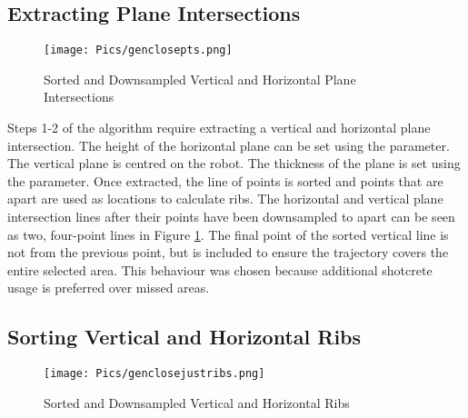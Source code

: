 \subsection{Extracting Plane Intersections}


\begin{figure}[H]
    \centering
    \texttt{[image: Pics/genclosepts.png]}
    \caption{Sorted and Downsampled Vertical and Horizontal Plane Intersections}
    \label{fig:sortedintersections}
\end{figure}

Steps 1-2 of the algorithm require extracting a vertical and horizontal plane intersection. The height of the horizontal plane can be set using the  parameter. The vertical plane is centred on the robot. The thickness of the plane is set using the  parameter. Once extracted, the line of points is sorted and points that are  apart are used as locations to calculate ribs. The horizontal and vertical plane intersection lines after their points have been downsampled to  apart can be seen as two, four-point lines in Figure \ref{fig:sortedintersections}. The final point of the sorted vertical line is not  from the previous point, but is included to ensure the trajectory covers the entire selected area. This behaviour was chosen because additional shotcrete usage is preferred over missed areas.\\

\subsection{Sorting Vertical and Horizontal Ribs}
\label{sec:sortlines}
\begin{figure}[H]
    \centering
    \texttt{[image: Pics/genclosejustribs.png]}
    \caption{Sorted and Downsampled Vertical and Horizontal Ribs}
    \label{fig:ribs}
\end{figure}


